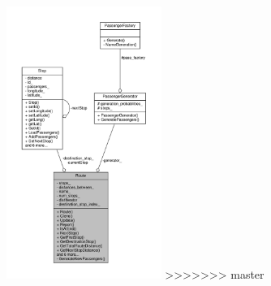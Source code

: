\begin{figure}[H]
\begin{center}
\begin{figure}[H]
\begin{center}
\leavevmode
\includegraphics[width=143pt]{classRoute__coll__graph}
>>>>>>> master
\end{center}
\end{figure}

\end{center}
\end{figure}
